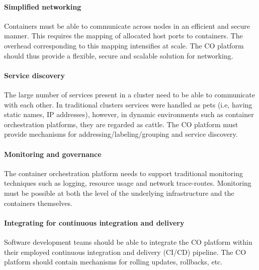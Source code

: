 \paragraph{Simplified networking}
Containers must be able to communicate across nodes in  an efficient and secure manner. This requires the mapping of allocated host ports to containers. The overhead corresponding to this mapping intensifies at scale. The CO platform should thus provide a flexible, secure and scalable solution for networking.~\cite{khan2017key}
\paragraph{Service discovery}
The large number of services present in a cluster need to be able to communicate with each other. In traditional clusters services were handled as pets (i.e, having static names, IP addresses), however, in dynamic environments such as container orchestration platforms, they are regarded as cattle. The CO platform must provide mechanisms for addressing/labeling/grouping and service discovery.~\cite{khan2017key} 
\paragraph{Monitoring and governance}
The container orchestration platform needs to support traditional monitoring techniques such as logging, resource usage and network trace-routes. Monitoring must be possible at both the level of the underlying infrastructure and the containers themselves.~\cite{khan2017key}
\paragraph{Integrating for continuous integration and delivery}
Software development teams should be able to integrate the CO platform within their employed continuous integration and delivery (CI/CD) pipeline. The CO platform should contain mechanisms for rolling updates, rollbacks, etc.~\cite{khan2017key}


